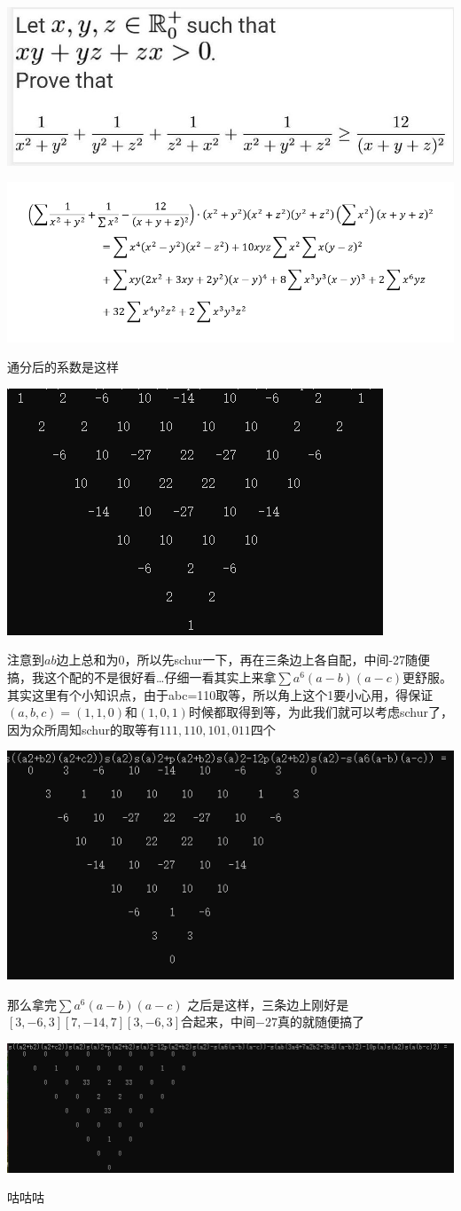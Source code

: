 \documentclass[UTF8]{ctexart}
\begin{document}
\subsection{}
\begin{center}
	\includegraphics[width=0.6\linewidth]{a010}
\end{center}
\begin{center}
	\includegraphics[width=0.7\linewidth]{a020}
\end{center}
通分后的系数是这样
\begin{center}
	\includegraphics[width=0.7\linewidth]{a030}
\end{center}
注意到$ ab $边上总和为0，所以先schur一下，再在三条边上各自配，中间-27随便搞，我这个配的不是很好看…仔细一看其实上来拿$  \displaystyle \sum a^{6}(a-b)(a-c) $更舒服。其实这里有个小知识点，由于abc=110取等，所以角上这个1要小心用，得保证$ (a,b,c)=(1,1,0) $和$ (1,0,1) $时候都取得到等，为此我们就可以考虑schur了，因为众所周知schur的取等有$ 111,110,101,011 $四个
\begin{center}
	\includegraphics[width=0.7\linewidth]{a040}
\end{center}
那么拿完$  \displaystyle \sum a^{6}(a-b)(a-c) $ 之后是这样，三条边上刚好是$ [3,-6,3][7,-14,7][3,-6,3] $合起来，中间$ -27 $真的就随便搞了
\begin{center}
	\includegraphics[width=0.7\linewidth]{a050}
\end{center}
咕咕咕
\end{document}
